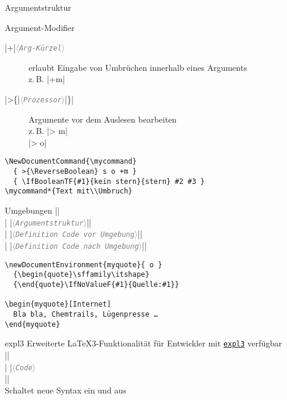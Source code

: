 \documentclass{beamer}
\newcommand{\meta}[1]{\textcolor{gray}{$\langle$\texttt{\textsl{#1}}$\rangle$}}
\newcommand{\pkg}[1]{\href{http://ctan.org/pkg/#1}{\alert{\texttt{#1}}}}
\begin{document}
\begin{frame}[fragile]{Argumentstruktur}
\begin{block}{Argument-Modifier}
\begin{description}
\item[|+|\meta{Arg-Kürzel}] erlaubt Eingabe von Umbrüchen innerhalb eines Arguments \\
	z.\,B. |+m|
\item[|>\{|\meta{Prozessor}|\}|] Argumente vor dem Auslesen bearbeiten \\
	z.\,B. |> {\ReverseBoolean} m|\\|> {\TrimSpaces} o|
\end{description}
\end{block}
\hfill
\begin{lstlisting}
\NewDocumentCommand{\mycommand}
  { >{\ReverseBoolean} s o +m }
  { \IfBooleanTF{#1}{kein stern}{stern} #2 #3 }
\mycommand*{Text mit\\Umbruch}
\end{lstlisting}
\end{frame}

\begin{frame}[fragile]{Umgebungen}
|\NewDocumentEnvironment{|\meta{Umgebungsname}|}|\\
|  {|\meta{Argumentstruktur}|}|\\
|  {|\meta{Definition Code \emph{vor} Umgebung}|}|\\
|  {|\meta{Definition Code \emph{nach} Umgebung}|}|\vfill

\begin{lstlisting}
\newDocumentEnvironment{myquote}{ o }
  {\begin{quote}\sffamily\itshape}
  {\end{quote}\IfNoValueF{#1}{Quelle:#1}}
  
\begin{myquote}[Internet]
  Bla bla, Chemtrails, Lügenpresse …
\end{myquote}
\end{lstlisting}
\end{frame}


\begin{frame}[fragile]{expl3}
Erweiterte \LaTeX3-Funktionalität für Entwickler mit \pkg{expl3} verfügbar\\[1ex]

|\ExplSyntaxOn|\\
|  |\meta{Code}\\
|\ExplSyntaxOff|\\[1ex]

Schaltet neue Syntax ein und aus
\end{frame}
\end{document}
